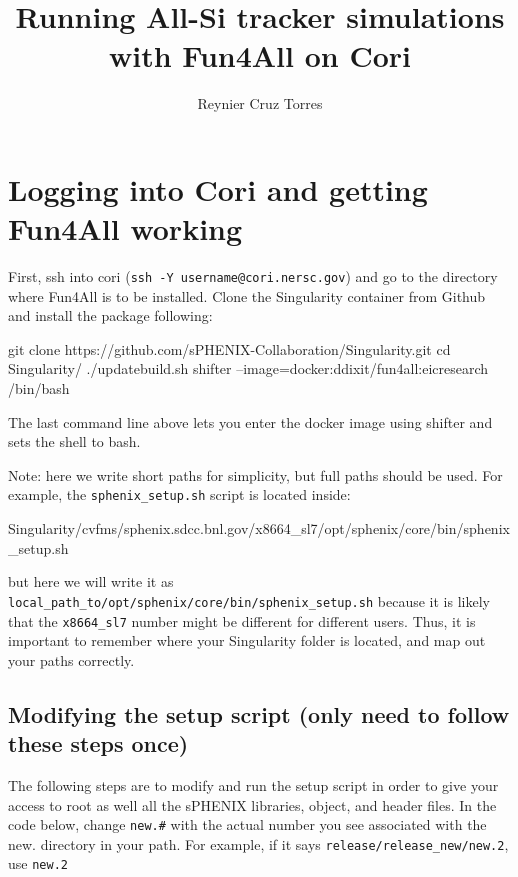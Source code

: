 \documentclass[12pt]{article}
\title{Running All-Si tracker simulations with Fun4All on Cori}
\author{Reynier Cruz Torres}
\begin{document}
\maketitle

\tableofcontents

\newpage
\section{Logging into Cori and getting Fun4All working}

First, ssh into cori (\verb|ssh -Y username@cori.nersc.gov|) and go to the directory where Fun4All is to be installed.
Clone the Singularity container from Github and install the package following:

\begin{tcolorbox}
\begin{verbnobox}[\scriptsize]
git clone https://github.com/sPHENIX-Collaboration/Singularity.git
cd Singularity/
./updatebuild.sh
shifter --image=docker:ddixit/fun4all:eicresearch /bin/bash
\end{verbnobox}  
\end{tcolorbox}

The last command line above lets you enter the docker image using shifter and sets the shell to bash.

Note: here we write short paths for simplicity, but full paths should be used.
For example, the \verb|sphenix_setup.sh| script is located inside:

\begin{tcolorbox}
\begin{verbnobox}[\scriptsize]
Singularity/cvfms/sphenix.sdcc.bnl.gov/x8664_sl7/opt/sphenix/core/bin/sphenix_setup.sh
\end{verbnobox}  
\end{tcolorbox}

but here we will write it as \verb|local_path_to/opt/sphenix/core/bin/sphenix_setup.sh| because it is likely that the \verb|x8664_sl7| number might be different for different users.
Thus, it is important to remember where your Singularity folder is located, and map out your paths correctly.

\subsection{Modifying the setup script (only need to follow these steps once)}
The following steps are to modify and run the setup script in order to give your access to root as well all the sPHENIX libraries, object, and header files.
In the code below, change \verb|new.#| with the actual number you see associated with the new. directory in your path. For example, if it says \verb|release/release_new/new.2|, use \verb|new.2|
\end{document}
